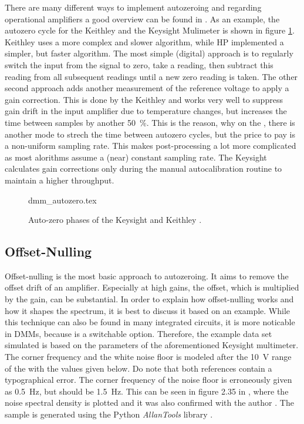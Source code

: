 There are many different ways to implement autozeroing and regarding operational amplifiers a good overview can be found in \cite{horowitz1989}. As an example, the autozero cycle for the Keithley  and the Keysight  Mulimeter is shown in figure \ref{fig:dmm_autozero_comparison}. Keithley uses a more complex and slower algorithm, while HP implemented a simpler, but faster algorithm. The most simple (digital) approach is to regularly switch the input from the signal to zero, take a reading, then subtract this reading from all subsequent readings until a new zero reading is taken. The other second approach adds another measurement of the reference voltage to apply a gain correction. This is done by the Keithley  and works very well to suppress gain drift in the input amplifier due to temperature changes, but increases the time between samples by another \qty{50}{\percent}. This is the reason, why on the , there is another mode to strech the time between autozero cycles, but the price to pay is a non-uniform sampling rate. This makes post-processing a lot more complicated as most alorithms assume a (near) constant sampling rate. The Keysight  calculates gain corrections only during the manual autocalibration routine to maintain a higher throughput.

\begin{figure}[hb]
    \centering
        {dmm_autozero.tex}
    \caption{Auto-zero phases of the Keysight  and Keithley .}
    \label{fig:dmm_autozero_comparison}
\end{figure}

\subsection{Offset-Nulling}
Offset-nulling is the most basic approach to autozeroing. It aims to remove the offset drift of an amplifier. Especially at high gains, the offset, which is multiplied by the gain, can be substantial. In order to explain how offset-nulling works and how it shapes the spectrum, it is best to discuss it based on an example. While this technique can also be found in many integrated circuits, it is more noticable in DMMs, because is a switchable option. Therefore, the example data set simulated is based on the parameters of the aforementioned Keysight  multimeter. The corner frequency and the white noise floor is modeled after the \qty{10}{\V} range of the  \cite{3458A_noise_floor, sampling_with_3458A} with the values given below. Do note that both references \cite{3458A_noise_floor, sampling_with_3458A} contain a typographical error. The corner frequency of the noise floor is erroneously given as \qty{0.5}{\Hz}, but should be \qty{1.5}{\Hz}. This can be seen in figure 2.35 in \cite{sampling_with_3458A}, where the noise spectral density is plotted and it was also confirmed with the author \cite{lapuh_email_corner_frequency}. The sample is generated using the Python \textit{AllanTools} library \cite{allantools}.

